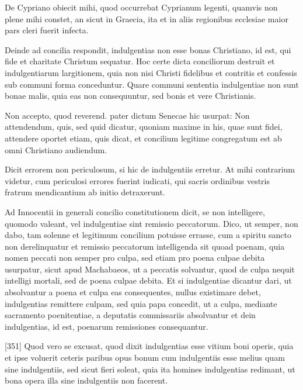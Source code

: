 De Cypriano obiecit mihi, quod occurrebat Cyprianum legenti, quamvis non plene mihi constet, an sicut in Graecia, ita et in aliis regionibus ecclesiae maior pars cleri fuerit infecta.

Deinde ad concilia respondit, indulgentias non esse bonas Christiano, id est, qui fide et charitate Christum sequatur. Hoc certe dicta conciliorum destruit et indulgentiarum largitionem, quia non nisi Christi fidelibus et contritis et confessis sub communi forma conceduntur. Quare communi sententia indulgentiae non sunt bonae malis, quia eas non consequuntur, sed bonis et vere Christianis.

Non accepto, quod reverend. pater dictum Senecae hic usurpat: Non attendendum, quis, sed quid dicatur, quoniam maxime in his, quae sunt fidei, attendere oportet etiam, quis dicat, et concilium legitime congregatum est ab omni Christiano audiendum.

Dicit errorem non periculosum, si hic de indulgentiis erretur. At mihi contrarium videtur, cum periculosi errores fuerint iudicati, qui sacris ordinibus vestris fratrum mendicantium ab initio detraxerunt.

Ad Innocentii in generali concilio constitutionem dicit, se non intelligere, quomodo valeant, vel indulgentiae sint remissio peccatorum. Dico, ut semper, non dabo, tam solenne et legitimum concilium potuisse errasse, cum a spiritu sancto non derelinquatur et remissio peccatorum intelligenda sit quoad poenam, quia nomen peccati non semper pro culpa, sed etiam pro poena culpae debita usurpatur, sicut apud Machabaeos, ut a peccatis solvantur, quod de culpa nequit intelligi mortali, sed de poena culpae debita. Et si indulgentiae dicantur dari, ut absolvantur a poena et culpa eas consequentes, nullus existimare debet, indulgentias remittere culpam, sed quia papa concedit, ut a culpa, mediante sacramento poenitentiae, a deputatis commissariis absolvantur et dein indulgentias, id est, poenarum remissiones consequantur.

[351] Quod vero se excusat, quod dixit indulgentias esse vitium boni operis, quia et ipse voluerit ceteris paribus opus bonum cum indulgentiis esse melius quam sine indulgentiis, sed sicut fieri soleat, quia ita homines indulgentias redimant, ut bona opera illa sine indulgentiis non facerent.

